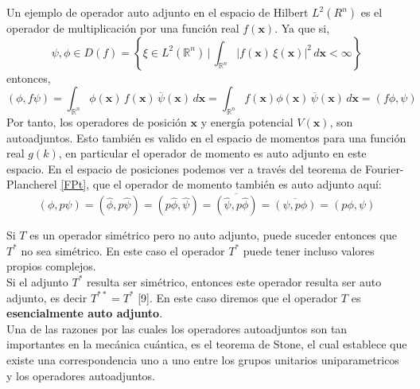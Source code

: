 \documentclass[12pt]{book}
\numberwithin{equation}{chapter}
\def\ol{\overline}
\def\R{\mathbb{R}}
\def\x{\mathbf{x}}
\def\hpsi{\hat{\psi}}
\def\hphi{\hat{\phi}}
\begin{document}
Un ejemplo de operador auto adjunto en el espacio de Hilbert $L^{2}(R^{n})$ es el operador de multiplicaci\'on por una funci\'on real $f(\x)$. Ya que si,
$$ \psi , \phi \in D(f)= \left\{ \xi \in L^{2}(\R^{n}) \,\Big|\, \int_{\R^{n}} |f(\x) \, \xi (\x)|^{2} \, d\x < \infty \right\} $$
entonces,
$$ (\phi , f \psi)= \int_{\R^{n}} \phi(\x)\, f(\x)\, \ol{\psi}(\x) \, d\x =\int_{\R^{n}}f(\x) \phi(\x)\,\ol{\psi}(\x) \, d\x=(f \phi ,  \psi) $$
Por tanto, los operadores de posici\'on $\x$ y energ\'ia potencial $V(\x)$, son autoadjuntos. Esto tambi\'en es valido en el espacio de momentos para una funci\'on real $g(k)$, en particular el operador de momento es auto adjunto en este espacio. En el espacio de posiciones podemos ver a trav\'es del teorema de Fourier-Plancherel \ref{FPt}, que el operador de momento tambi\'en es auto adjunto aqu\'i:
\begin{equation}
(\phi , p \psi ) = ( \hphi , p\hpsi ) =(p \hphi , \hpsi)= \ol{ ( \hpsi , p\hphi ) }= \ol{ ( \psi , p \phi ) }= ( p\phi , \psi ) 
\end{equation}

Si $T$ es un operador sim\'etrico pero no auto adjunto, puede suceder entonces que $T^{*}$ no sea sim\'etrico. En este caso el operador $T^{*}$ puede tener incluso valores propios complejos. \\ Si el adjunto $T^{*}$ resulta ser sim\'etrico, entonces este operador resulta ser auto adjunto, es decir $T^{**}= T^{*}$ [9]. En este caso diremos que el operador $T$ es {\bf esencialmente auto adjunto}.\\

Una de las razones por las cuales los operadores autoadjuntos son tan importantes en la mec\'anica cu\'antica, es el teorema de Stone, el cual establece que existe una correspondencia uno a uno entre los grupos unitarios uniparametricos y los operadores autoadjuntos.

\vspace{3 mm}
\end{document}
